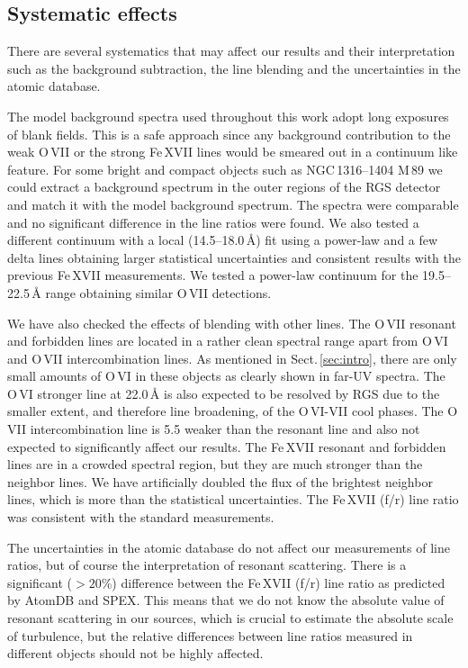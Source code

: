 \documentclass[useAMS,usenatbib]{mn2e}
\begin{document}
\subsection{Systematic effects}
\label{sec:systematics}

{There are several systematics that may affect our results and their interpretation 
such as the background subtraction, the line blending and the uncertainties in the atomic database.}

{The model background spectra used throughout this work adopt long exposures of blank fields.
This is a safe approach since any background contribution to the weak O\,{\small VII} 
or the strong Fe\,{\small XVII} lines would be smeared out in a continuum like feature.
For some bright and compact objects such as NGC\,1316--1404 M\,89
we could extract a background spectrum in the outer regions of the RGS detector
and match it with the model background spectrum.
The spectra were comparable and no significant difference in the line ratios were found.
We also tested a different continuum with a local (14.5--18.0\,{\AA}) fit 
using a power-law and a few delta lines obtaining larger statistical uncertainties 
and consistent results with the previous Fe\,{\small XVII} measurements.
We tested a power-law continuum for the 19.5--22.5\,{\AA} range 
obtaining similar O\,{\small VII} detections.}

{We have also checked the effects of blending with other lines. 
The O\,{\small VII} resonant and forbidden lines 
are located in a rather clean spectral range apart from O\,{\small VI} and O\,{\small VII} 
intercombination lines. As mentioned in Sect.\,\ref{sec:intro}, there are only small amounts 
of O\,{\small VI} in these objects as clearly shown in far-UV spectra. 
The O\,{\small VI} stronger line at 22.0\,{\AA} is also expected to be resolved by RGS
due to the smaller extent, and therefore line broadening, of the O\,{\small VI-VII} cool phases. 
The O\,{\small VII} intercombination line is 5.5 weaker than the resonant line 
and also not expected to significantly affect our results. 
The Fe\,{\small XVII} resonant and forbidden lines are in a crowded spectral region, 
but they are much stronger than the neighbor lines. 
We have artificially doubled the flux of the brightest neighbor lines, which is more
than the statistical uncertainties. The Fe\,{\small XVII} (f/r) line ratio was consistent 
with the standard measurements.}

{The uncertainties in the atomic database do not affect our measurements of line ratios,
but of course the interpretation of resonant scattering. There is a significant ($>20$\%)
difference between the Fe\,{\small XVII} (f/r) line ratio as predicted by AtomDB and SPEX.
This means that we do not know the absolute value of resonant scattering in our sources,
which is crucial to estimate the absolute scale of turbulence, but the relative differences 
between line ratios measured in different objects should not be highly affected.}
\end{document}
